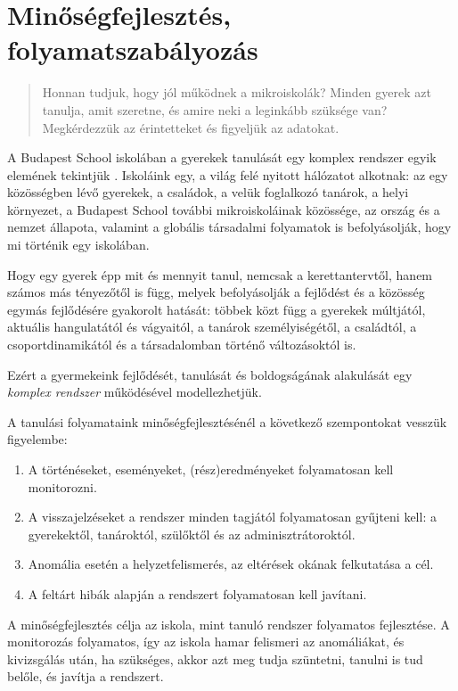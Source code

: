 \section{Minőségfejlesztés, folyamatszabályozás}
\label{sec:minosegbiztositas}
\begin{quote}
      Honnan tudjuk, hogy jól működnek a mikroiskolák? Minden gyerek azt
      tanulja,
      amit szeretne, és amire neki a leginkább szüksége van? Megkérdezzük az
      érintetteket és figyeljük az adatokat.
\end{quote}

A Budapest School iskolában a gyerekek tanulását egy komplex rendszer egyik
elemének tekintjük \citep{barabasi}. Iskoláink egy, a világ felé nyitott
hálózatot alkotnak: az egy közösségben lévő gyerekek, a családok, a velük
foglalkozó tanárok, a helyi környezet, a Budapest School további
mikroiskolái\-nak közössége, az ország és a nemzet állapota, valamint a globális
társadalmi folyamatok is befolyásolják, hogy mi történik egy iskolában.

Hogy egy gyerek épp mit és mennyit tanul, nemcsak a kerettantervtől,
hanem számos más tényezőtől is függ, melyek befolyásolják a fejlődést és a
közösség egymás fejlődésére gyakorolt hatását: többek közt függ a gyerekek
múltjától, aktuális hangulatától és vágyaitól, a tanárok személyiségétől, a
családtól, a csoportdinamikától és a társadalomban történő változásoktól
is.

Ezért a gyermekeink fejlődését, tanulását és boldogságának alakulását egy
\emph{komplex rendszer} működésével modellezhetjük.

A tanulási folyamataink minőségfejlesztésénél a következő szempontokat vesszük
figyelembe:
\begin{enumerate}
      \item  A történéseket, eseményeket, (rész)eredményeket folyamatosan kell
            monitorozni.
      \item  A visszajelzéseket a rendszer minden tagjától folyamatosan
            gyűjteni kell: a gyerekektől, tanároktól, szülőktől és az
            adminisztrátoroktól.
      \item Anomália esetén a helyzetfelismerés, az eltérések okának
            felkutatása a
            cél.
      \item A feltárt hibák alapján a rendszert folyamatosan kell javítani.
\end{enumerate}

A minőségfejlesztés célja az iskola, mint tanuló rendszer folyamatos
fejlesztése. A monitorozás folyamatos,
így az iskola hamar  felismeri az anomáliákat, és kivizsgálás után, ha szükséges,
akkor azt meg tudja szüntetni, tanulni is tud belőle, és
javítja a rendszert.

